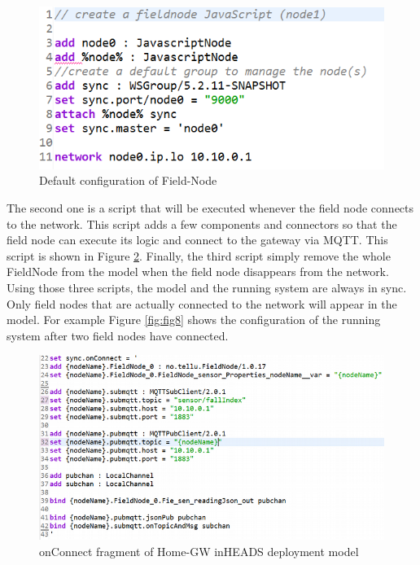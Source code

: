 \begin{figure}[h]
	\centering
	\includegraphics[width=0.7\linewidth]{figures/fig6}
	\caption{Default configuration of Field-Node}
	\label{fig:fig6}
\end{figure}

The second one is a script that will be executed whenever the field node connects to the network. This script adds a few components and connectors so that the field node can execute its logic and connect to the gateway via MQTT. This script is shown in Figure \ref{fig:fig7}. 
Finally, the third script simply remove the whole FieldNode from the model when the field node disappears from the network. Using those three scripts, the model and the running system are always in sync. Only field nodes that are actually connected to the network will appear in the model. For example Figure \ref{fig:fig8} shows the configuration of the running system after two field nodes have connected. 

\begin{figure}[h]
	\centering
	\includegraphics[width=1\linewidth]{figures/fig7}
	\caption{onConnect fragment of Home-GW inHEADS deployment model}
	\label{fig:fig7}
\end{figure}



